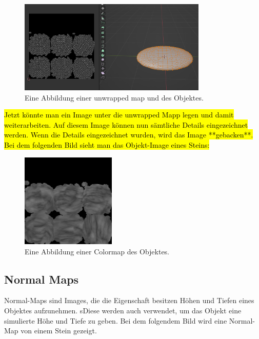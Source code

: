 \begin{figure}[H]
    \centering
    \includegraphics[width=0.8\textwidth]{chapters/11/Images/StoneAndUnwrap.png}
    \caption{Eine Abbildung einer unwrapped map und des Objektes.}
    \label{htl01}
\end{figure}

\noindent \hl{Jetzt könnte man ein Image unter die unwrapped Mapp legen und damit weiterarbeiten. Auf diesem Image können nun sämtliche Details eingezeichnet werden. Wenn die Details eingezeichnet wurden, wird das Image **gebacken**. Bei dem folgenden Bild sieht man das Objekt-Image eines Steins:} %

\begin{figure}[H]
    \centering
    \includegraphics[width=0.4\textwidth]{chapters/11/Images/SteinColor.png}
    \caption{Eine Abbildung einer Colormap des Objektes.}
    \label{htl01}
\end{figure}

\subsection{Normal Maps}

Normal-Maps sind Images, die die Eigenschaft besitzen Höhen und Tiefen eines Objektes aufzunehmen. sDiese werden auch verwendet, um das Objekt eine simulierte Höhe und Tiefe zu geben. Bei dem folgendem Bild wird eine Normal-Map von einem Stein gezeigt.

